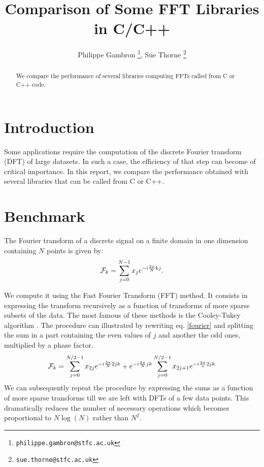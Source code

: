 \documentclass[12pt, a4paper]{article}
\date{}
\begin{document}
\title{Comparison of Some FFT Libraries in C/C++}
\author{Philippe Gambron \thanks{\texttt{philippe.gambron{@}stfc.ac.uk}}, Sue Thorne \thanks{\texttt{sue.thorne{@}stfc.ac.uk}}}
\maketitle
\begin{abstract}
We compare the performance of several libraries computing FFTs called from C or C++ code. 
\end{abstract}
\section{Introduction}
Some applications require the computation of the discrete Fourier transform (DFT) of large datasets. In such a case, the efficiency of that step can become of critical importance. In this report, we compare the performance obtained with several libraries that can be called from C or C++.

\section{Benchmark}
The Fourier transform of a discrete signal on a finite domain in one dimension containing $N$ points is given by:
\begin{equation}
{\cal F}_k=\sum_{j=0}^{N-1} x_j e^{-i\frac{2\pi}{N}kj}.
\end{equation}\label{fourier}

We compute it using the Fast Fourier Transform (FFT) method. It consists in expressing the transform recursively as a function of transforms of more sparse subsets of the data. The most famous of these methods is the Cooley-Tukey algorithm \cite{CT}. The procedure can illustrated by rewriting eq. \ref{fourier} and splitting the sum in a part containing the even values of $j$ and another the odd ones, multiplied by a phase factor.
\begin{equation}
{\cal F}_k=\sum_{j=0}^{N/2-1}x_{2j}e^{-i\frac{2\pi}{N}2jk}+e^{-i\frac{2\pi}{N}jk}\sum_{j=0}^{N/2-1}x_{2j+1}e^{-i\frac{2\pi}{n}2jk}
\end{equation}\label{ct}
We can subsequently repeat the procedure by expressing the sums as a function of more sparse transforms till we are left with DFTs of a few data points. This dramatically reduces the number of necessary operations which becomes proportional to $N\log(N)$ rather than $N^2$.\\
\end{document}
